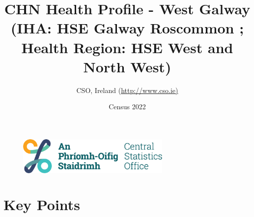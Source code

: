 \documentclass{article}
\title{CHN Health Profile - West Galway (IHA: HSE Galway Roscommon ;  Health Region: HSE West and North West) }
\date{Census 2022}
\author{CSO, Ireland  (\url{http://www.cso.ie)}}
\begin{document}


\begin{figure}
	\centering
\includegraphics[width =75mm]{../figures/CSO_Logo.png}
\end{figure}

				 
		   
						  
														  
																																													
												 
			 
\maketitle
					
													   
				 
						 
																																																																											   
				 
				  
  \pagebreak
    	    \tableofcontents

\pagebreak


\section{Key Points}
\end{document}
